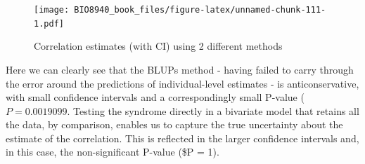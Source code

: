 \documentclass[
  12pt,
]{book}
\newenvironment{Shaded}{\begin{snugshade}}{\end{snugshade}}
\newcommand{\AttributeTok}[1]{\textcolor[rgb]{0.77,0.63,0.00}{#1}}
\newcommand{\DecValTok}[1]{\textcolor[rgb]{0.00,0.00,0.81}{#1}}
\newcommand{\FloatTok}[1]{\textcolor[rgb]{0.00,0.00,0.81}{#1}}
\newcommand{\FunctionTok}[1]{\textcolor[rgb]{0.00,0.00,0.00}{#1}}
\newcommand{\NormalTok}[1]{#1}
\newcommand{\OtherTok}[1]{\textcolor[rgb]{0.56,0.35,0.01}{#1}}
\newcommand{\SpecialCharTok}[1]{\textcolor[rgb]{0.00,0.00,0.00}{#1}}
\newcommand{\StringTok}[1]{\textcolor[rgb]{0.31,0.60,0.02}{#1}}
\begin{document}
\begin{Shaded}
\end{Shaded}

\begin{figure}
\centering
\texttt{[image: BIO8940\_book\_files/figure-latex/unnamed-chunk-111-1.pdf]}
\caption{\label{fig:unnamed-chunk-111}Correlation estimates (with CI) using 2 different methods}
\end{figure}

Here we can clearly see that the BLUPs method - having failed to carry through the error around the predictions of individual-level estimates - is anticonservative, with small confidence intervals and a correspondingly small P-value (\(P = 0.0019099\). Testing the syndrome directly in a bivariate model that retains all the data, by
comparison, enables us to capture the true uncertainty about the estimate of the correlation. This is reflected
in the larger confidence intervals and, in this case, the non-significant P-value (\$P = 1).
\end{document}
